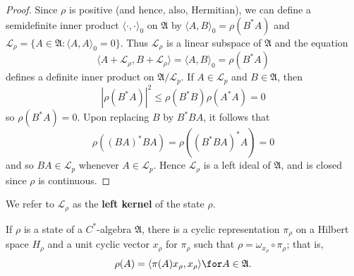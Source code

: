 \begin{proof}
Since $\rho$ is positive (and hence, also, Hermitian), we can define a semidefinite inner product $\langle\cdot,\cdot\rangle_0$ on $\mathfrak{A}$ by $\langle A,B\rangle_0=\rho(B^*A)$ and $\mathscr{L}_\rho=\{A\in\mathfrak{A}:\langle A,A\rangle_0=0\}$. Thus $\mathscr{L}_\rho$ is a linear subspace of $\mathfrak{A}$ and the equation
\[\langle A+\mathscr{L}_\rho,B+\mathscr{L}_\rho\rangle=\langle A,B\rangle_0=\rho(B^*A)\]
defines a definite inner product on $\mathfrak{A}/\mathscr{L}_p$. If $A\in\mathscr{L}_p$ and $B\in\mathfrak{A}$, then
\[|\rho(B^*A)|^2\leq\rho(B^*B)\rho(A^*A)=0\]
so $\rho(B^*A)=0$. Upon replacing $B$ by $B^*BA$, it follows that
\[\rho((BA)^*BA)=\rho((B^*BA)^*A)=0\]
and so $BA\in\mathscr{L}_p$ whenever $A\in\mathscr{L}_p$. Hence $\mathscr{L}_\rho$ is a left ideal of $\mathfrak{A}$, and is closed since $\rho$ is continuous.
\end{proof}
We refer to $\mathscr{L}_\rho$ as the \textbf{left kernel} of the state $\rho$.
\begin{theorem}\label{C^* cyclic representation for state}
If $\rho$ is a state of a $C^*$-algebra $\mathfrak{A}$, there is a cyclic representation $\pi_\rho$ on a Hilbert space $H_\rho$ and a unit cyclic vector $x_\rho$ for $\pi_\rho$ such that $\rho=\omega_{x_\rho}\circ\pi_\rho$; that is,
\[\rho(A)=\langle\pi(A)x_\rho,x_\rho\rangle\for A\in\mathfrak{A}.\]
\end{theorem}
